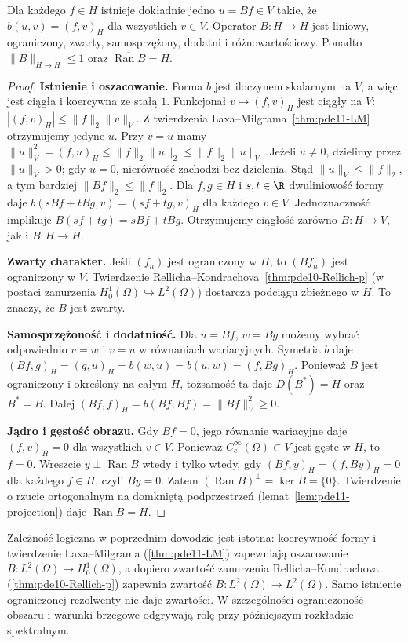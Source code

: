 \begin{twierdzenie}
\label{thm:pde12-resolvent}
Dla każdego $f\in H$ istnieje dokładnie jedno $u=Bf\in V$
takie, że $b(u,v)=(f,v)_H$ dla wszystkich $v\in V$.
Operator $B:H\to H$ jest liniowy, ograniczony, zwarty,
samosprzężony, dodatni i różnowartościowy. Ponadto
$\|B\|_{H\to H}\le1$ oraz $\overline{\operatorname{Ran}B}=H$.
\end{twierdzenie}
\begin{proof}
\textbf{Istnienie i oszacowanie.} Forma $b$ jest
iloczynem skalarnym na $V$, a więc jest ciągła i koercywna
ze stałą $1$. Funkcjonał $v\mapsto(f,v)_H$ jest ciągły na $V$:
$|(f,v)_H|\le\|f\|_2\|v\|_V$. Z twierdzenia
Laxa--Milgrama~\ref{thm:pde11-LM} otrzymujemy jedyne $u$.
Przy $v=u$ mamy
$\|u\|_V^2=(f,u)_H\le\|f\|_2\|u\|_2\le\|f\|_2\|u\|_V$.
Jeżeli $u\ne0$, dzielimy przez $\|u\|_V>0$;
gdy $u=0$, nierówność zachodzi bez dzielenia.
Stąd $\|u\|_V\le\|f\|_2$, a tym bardziej
$\|Bf\|_2\le\|f\|_2$. Dla $f,g\in H$ i $s,t\in\R$
dwuliniowość formy daje
$b(sBf+tBg,v)=(sf+tg,v)_H$ dla każdego $v\in V$.
Jednoznaczność implikuje $B(sf+tg)=sBf+tBg$.
Otrzymujemy ciągłość zarówno $B:H\to V$, jak i $B:H\to H$.

\textbf{Zwarty charakter.} Jeśli $(f_n)$ jest ograniczony w $H$,
to $(Bf_n)$ jest ograniczony w $V$. Twierdzenie
Rellicha--Kondrachova~\ref{thm:pde10-Rellich-p} (w postaci
zanurzenia $H_0^1(\Omega)\hookrightarrow L^2(\Omega)$)
dostarcza podciągu zbieżnego w $H$. To znaczy, że $B$
jest zwarty.

\textbf{Samosprzężoność i dodatniość.} Dla $u=Bf$, $w=Bg$
możemy wybrać odpowiednio $v=w$ i $v=u$ w równaniach
wariacyjnych. Symetria $b$ daje
$(Bf,g)_H=(g,u)_H=b(w,u)=b(u,w)=(f,Bg)_H$.
Ponieważ $B$ jest ograniczony i określony na całym $H$,
tożsamość ta daje $D(B^*)=H$ oraz $B^*=B$.
Dalej $(Bf,f)_H=b(Bf,Bf)=\|Bf\|_V^2\ge0$.

\textbf{Jądro i gęstość obrazu.} Gdy $Bf=0$, jego równanie
wariacyjne daje $(f,v)_H=0$ dla wszystkich $v\in V$.
Ponieważ $C_c^\infty(\Omega)\subset V$ jest gęste w $H$,
to $f=0$. Wreszcie
$y\perp\operatorname{Ran}B$ wtedy i tylko wtedy, gdy
$(Bf,y)_H=(f,By)_H=0$ dla każdego $f\in H$, czyli $By=0$.
Zatem $(\operatorname{Ran}B)^\perp=\ker B=\{0\}$.
Twierdzenie o rzucie ortogonalnym na domkniętą podprzestrzeń
(lemat~\ref{lem:pde11-projection}) daje
$\overline{\operatorname{Ran}B}=H$.
\end{proof}


\begin{uwaga}
\label{rem:pde-v42-compact-chain}
Zależność logiczna w poprzednim dowodzie jest istotna:
koercywność formy i twierdzenie Laxa--Milgrama
(\ref{thm:pde11-LM}) zapewniają oszacowanie
$B:L^2(\Omega)\to H_0^1(\Omega)$, a dopiero
zwartość zanurzenia Rellicha--Kondrachova
(\ref{thm:pde10-Rellich-p}) zapewnia zwartość
$B:L^2(\Omega)\to L^2(\Omega)$. Samo istnienie
ograniczonej rezolwenty nie daje zwartości.
W szczególności ograniczoność obszaru i warunki brzegowe
odgrywają rolę przy późniejszym rozkładzie spektralnym.
\end{uwaga}

